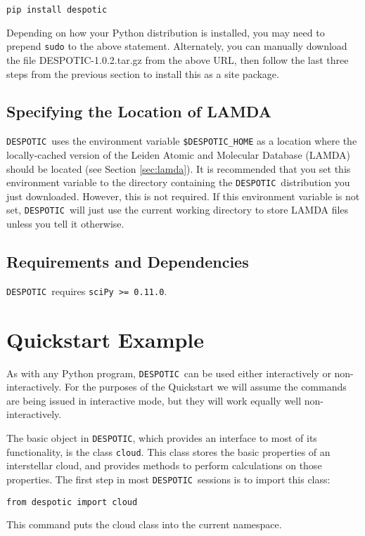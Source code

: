 \documentclass[12pt]{article}
\newcommand{\despotic}{\texttt{DESPOTIC}}
\begin{document}
\begin{verbatim}
pip install despotic
\end{verbatim}

Depending on how your Python distribution is installed, you may need to prepend \verb=sudo= to the above statement. Alternately, you can manually download the file DESPOTIC-1.0.2.tar.gz from the above URL, then follow the last three steps from the previous section to install this as a site package.


\subsection{Specifying the Location of LAMDA}

\despotic\ uses the environment variable \verb=$DESPOTIC_HOME= as a location where the locally-cached version of the Leiden Atomic and Molecular Database (LAMDA) should be located (see Section \ref{sec:lamda}). It is recommended that you set this environment variable to the directory containing the \despotic\ distribution you just downloaded. However, this is not required. If this environment variable is not set, \despotic\ will just use the current working directory to store LAMDA files unless you tell it otherwise.


\subsection{Requirements and Dependencies}

\despotic\ requires \verb;sciPy >= 0.11.0;.

\clearpage

\section{Quickstart Example}

As with any Python program, \despotic\ can be used either interactively or non-interactively. For the purposes of the Quickstart we will assume the commands are being issued in interactive mode, but they will work equally well non-interactively.

The basic object in \despotic, which provides an interface to most of its functionality, is the class \texttt{cloud}. This class stores the basic properties of an interstellar cloud, and provides methods to perform calculations on those properties. The first step in most \despotic\ sessions is to import this class:
\begin{verbatim}
from despotic import cloud
\end{verbatim}
This command puts the cloud class into the current namespace.
\end{document}
